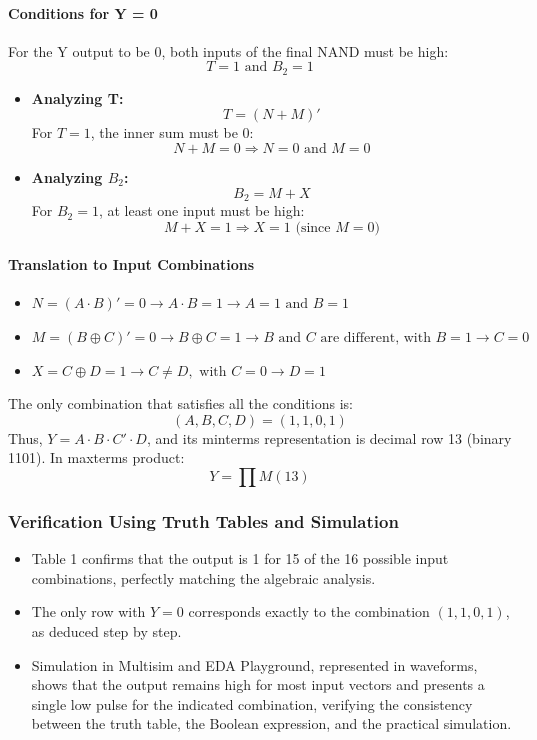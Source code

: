 \documentclass[12pt]{article}  %
\begin{document}
\paragraph{Conditions for Y = 0}
For the Y output to be 0, both inputs of the final NAND must be high:
$$T = 1 \text{ and } B_2 = 1$$
\begin{itemize}
    \item \textbf{Analyzing T:}
    $$T = (N + M)'$$
    For $T = 1$, the inner sum must be 0:
    $$N + M = 0 \Rightarrow N = 0 \text{ and } M = 0$$
    \item \textbf{Analyzing $B_2$:}
    $$B_2 = M + X$$
    For $B_2 = 1$, at least one input must be high:
    $$M + X = 1 \Rightarrow X = 1 \text{ (since } M = 0 \text{)}$$
\end{itemize}

\paragraph{Translation to Input Combinations}
\begin{itemize}
    \item $N = (A \cdot B)' = 0 \rightarrow A \cdot B = 1 \rightarrow A = 1 \text{ and } B = 1$
    \item $M = (B \oplus C)' = 0 \rightarrow B \oplus C = 1 \rightarrow B \text{ and } C \text{ are different, with } B = 1 \rightarrow C = 0$
    \item $X = C \oplus D = 1 \rightarrow C \neq D, \text{ with } C = 0 \rightarrow D = 1$
\end{itemize}
The only combination that satisfies all the conditions is:
$$(A,B,C,D) = (1,1,0,1)$$
Thus, $Y = A \cdot B \cdot C' \cdot D$, and its minterms representation is decimal row 13 (binary 1101). In maxterms product:
$$Y = \prod M(13)$$

\subsubsection{Verification Using Truth Tables and Simulation}
\begin{itemize}
    \item Table 1 confirms that the output is 1 for 15 of the 16 possible input combinations, perfectly matching the algebraic analysis.
    \item The only row with $Y = 0$ corresponds exactly to the combination $(1, 1, 0, 1)$, as deduced step by step.
    \item Simulation in Multisim and EDA Playground, represented in waveforms, shows that the output remains high for most input vectors and presents a single low pulse for the indicated combination, verifying the consistency between the truth table, the Boolean expression, and the practical simulation.
\end{itemize}
\end{document}
